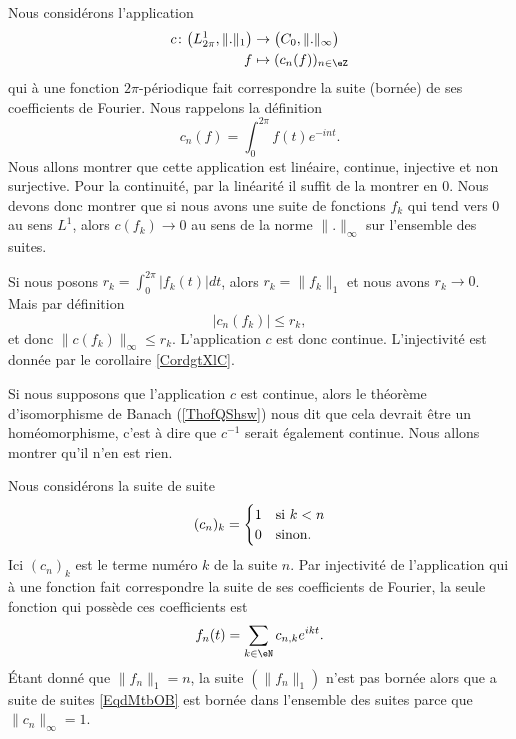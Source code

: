 Nous considérons l'application
\begin{equation}
    \begin{aligned}
        c\colon \big( L^1_{2\pi},\| . \|_1 \big)&\to \big( C_0,\| .\|_{\infty} \big) \\
        f&\mapsto (c_n(f))_{n\in \eZ} 
    \end{aligned}
\end{equation}
qui à une fonction \( 2\pi\)-périodique fait correspondre la suite (bornée) de ses coefficients de Fourier. Nous rappelons la définition
\begin{equation}
    c_n(f)=\int_0^{2\pi}f(t) e^{-int}.
\end{equation}
Nous allons montrer que cette application est linéaire, continue, injective et non surjective. Pour la continuité, par la linéarité il suffit de la montrer en \( 0\). Nous devons donc montrer que si nous avons une suite de fonctions \( f_k\) qui tend vers \( 0\) au sens \( L^1\), alors \( c(f_k)\to 0\) au sens de la norme \( \| . \|_{\infty}\) sur l'ensemble des suites.

Si nous posons \( r_k=\int_0^{2\pi}| f_k(t) |dt\), alors \( r_k=\| f_k \|_1\) et nous avons \( r_k\to 0\). Mais par définition
\begin{equation}
    | c_n(f_k) |\leq r_k,
\end{equation}
et donc \( \| c(f_k) \|_{\infty}\leq r_k\). L'application \( c\) est donc continue. L'injectivité est donnée par le corollaire \ref{CordgtXlC}. 

Si nous supposons que l'application \( c\) est continue, alors le théorème d'isomorphisme de Banach (\ref{ThofQShsw}) nous dit que cela devrait être un homéomorphisme, c'est à dire que \( c^{-1}\) serait également continue. Nous allons montrer qu'il n'en est rien.

Nous considérons la suite de suite
\begin{equation}    \label{EqdMtbOB}
    (c_n)_k=\begin{cases}
        1    &   \text{si \( k<n\)}\\
        0    &    \text{sinon}.
    \end{cases}
\end{equation}
Ici \( (c_n)_k\) est le terme numéro \( k\) de la suite \( n\). Par injectivité de l'application qui à une fonction fait correspondre la suite de ses coefficients de Fourier, la seule fonction qui possède ces coefficients est
\begin{equation}
    f_n(t)=\sum_{k\in \eN}c_{n,k} e^{ikt}.
\end{equation}
Étant donné que \( \| f_n \|_1=n\), la suite \( (\| f_n \|_1)\) n'est pas bornée alors que a suite de suites \eqref{EqdMtbOB} est bornée dans l'ensemble des suites parce que \( \| c_n \|_{\infty}=1\).


